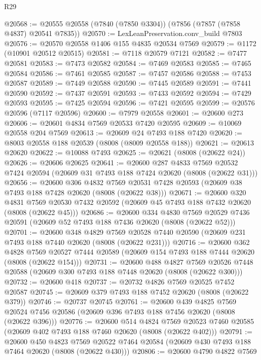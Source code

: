 \begin{lexlean}{R29}
\begin{coremodule}
@20568 := @20555 @20558 (@7840 (@7850 @3304)) (@7856 (@7857 (@7858 @4837) @20541 @7835))
@20570 := LexLeanPreservation.conv_build @7803
@20576 := @20570 @20558 @1406 @155 @4835 @20534 @7569
@20579 := @1172 (@10901 @20512 @20515)
@20581 := @7118 @20579 @7121
@20582 := @7477 @20581
@20583 := @7473 @20582
@20584 := @7469 @20583
@20585 := @7465 @20584
@20586 := @7461 @20585
@20587 := @7457 @20586
@20588 := @7453 @20587
@20589 := @7449 @20588
@20590 := @7445 @20589
@20591 := @7441 @20590
@20592 := @7437 @20591
@20593 := @7433 @20592
@20594 := @7429 @20593
@20595 := @7425 @20594
@20596 := @7421 @20595
@20599 := @20576 @20596 (@7117 @20596)
@20600 := @7979 @20558
@20601 := @20600 @273
@20606 := @20601 @4834 @7569 @20533 @7420 @20595
@20609 := @10069 @20558 @204 @7569
@20613 := @20609 @24 @7493 @188 @7420
@20620 := @8003 @20558 @188 @20539 (@8008 (@8009 @20558 @188))
@20621 := @20613 @20620
@20622 := @10088 @7493
@20625 := @20621 (@8008 (@20622 @24))
@20626 := @20606 @20625
@20641 := @20600
    @287
    @4833
    @7569
    @20532
    @7424
    @20594
    (@20609 @31 @7493 @188 @7424 @20620 (@8008 (@20622 @31)))
@20656 := @20600
    @306
    @4832
    @7569
    @20531
    @7428
    @20593
    (@20609 @38 @7493 @188 @7428 @20620 (@8008 (@20622 @38)))
@20671 := @20600
    @320
    @4831
    @7569
    @20530
    @7432
    @20592
    (@20609 @45 @7493 @188 @7432 @20620 (@8008 (@20622 @45)))
@20686 := @20600
    @334
    @4830
    @7569
    @20529
    @7436
    @20591
    (@20609 @52 @7493 @188 @7436 @20620 (@8008 (@20622 @52)))
@20701 := @20600
    @348
    @4829
    @7569
    @20528
    @7440
    @20590
    (@20609 @231 @7493 @188 @7440 @20620 (@8008 (@20622 @231)))
@20716 := @20600
    @362
    @4828
    @7569
    @20527
    @7444
    @20589
    (@20609 @154 @7493 @188 @7444 @20620 (@8008 (@20622 @154)))
@20731 := @20600
    @488
    @4827
    @7569
    @20526
    @7448
    @20588
    (@20609 @300 @7493 @188 @7448 @20620 (@8008 (@20622 @300)))
@20732 := @20600 @418
@20737 := @20732 @4826 @7569 @20525 @7452 @20587
@20745 := @20609 @379 @7493 @188 @7452 @20620 (@8008 (@20622 @379))
@20746 := @20737 @20745
@20761 := @20600
    @439
    @4825
    @7569
    @20524
    @7456
    @20586
    (@20609 @396 @7493 @188 @7456 @20620 (@8008 (@20622 @396)))
@20776 := @20600
    @514
    @4824
    @7569
    @20523
    @7460
    @20585
    (@20609 @402 @7493 @188 @7460 @20620 (@8008 (@20622 @402)))
@20791 := @20600
    @450
    @4823
    @7569
    @20522
    @7464
    @20584
    (@20609 @430 @7493 @188 @7464 @20620 (@8008 (@20622 @430)))
@20806 := @20600
    @4790
    @4822
    @7569

\end{coremodule}
\end{lexlean}
